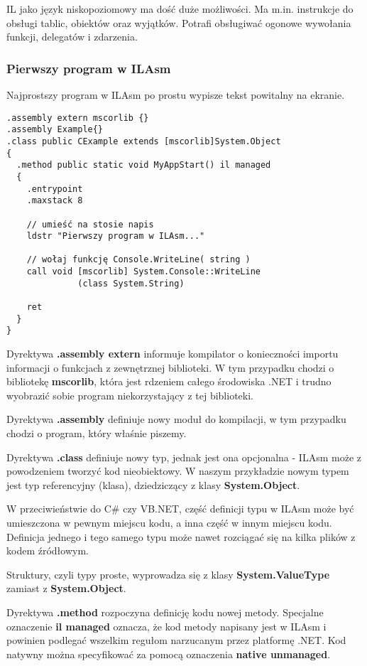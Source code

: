 IL jako język niskopoziomowy ma dość duże możliwości. 
Ma m.in. instrukcje do obsługi tablic, obiektów oraz wyjątków.
Potrafi obsługiwać ogonowe wywołania funkcji, delegatów i zdarzenia.

\subsubsection{Pierwszy program w ILAsm}

Najprostszy program w ILAsm po prostu wypisze tekst powitalny na ekranie.

\begin{scriptsize}
\begin{verbatim}
.assembly extern mscorlib {}
.assembly Example{} 
.class public CExample extends [mscorlib]System.Object
{ 
  .method public static void MyAppStart() il managed 
  { 
    .entrypoint 
    .maxstack 8

    // umieść na stosie napis
    ldstr "Pierwszy program w ILAsm..." 

    // wołaj funkcję Console.WriteLine( string )
    call void [mscorlib] System.Console::WriteLine
              (class System.String)

    ret 
  } 
}
\end{verbatim}
\end{scriptsize}

Dyrektywa {\bf .assembly extern} informuje kompilator o konieczności importu informacji o funkcjach
z zewnętrznej biblioteki. W tym przypadku chodzi o bibliotekę {\bf mscorlib}, która jest
rdzeniem całego środowiska .NET i trudno wyobrazić sobie program niekorzystający z tej biblioteki.

Dyrektywa {\bf .assembly} definiuje nowy moduł do kompilacji, w tym przypadku chodzi o 
program, który właśnie piszemy.

Dyrektywa {\bf .class} definiuje nowy
typ, jednak jest ona opcjonalna - ILAsm może z powodzeniem tworzyć kod nieobiektowy. W naszym
przykładzie nowym typem jest typ referencyjny (klasa), dziedziczący z klasy {\bf System.Object}. 

W przeciwieństwie do C\# czy VB.NET, część definicji typu w ILAsm może być umieszczona w pewnym
miejscu kodu, a inna część w innym miejscu kodu. Definicja jednego i tego samego typu może
nawet rozciągać się na kilka plików z kodem źródłowym.

Struktury, czyli typy proste, wyprowadza się z klasy {\bf System.ValueType} zamiast z {\bf System.Object}.

Dyrektywa {\bf .method} rozpoczyna definicję kodu nowej metody. Specjalne oznaczenie {\bf il managed} oznacza, że
kod metody napisany jest w ILAsm i powinien podlegać wszelkim regułom narzucanym przez platformę .NET. 
Kod natywny można specyfikować za pomocą oznaczenia {\bf native unmanaged}.

